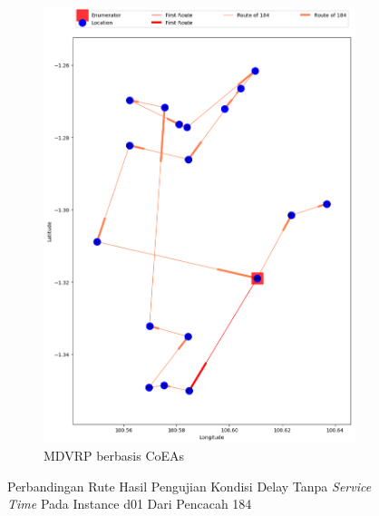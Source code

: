 \begin{figure}[H]
	\centering
	\begin{subfigure}[t]{\textwidth}
		\centering
		\includegraphics[width=\textwidth]{Resources/Images/delayed_1/real_m15_n100_delayed_1_184_coes}
		\caption{MDVRP berbasis CoEAs}
		\label{fig:real_m15_n100_delayed_1_184_coes}
	\end{subfigure}
	\caption{Perbandingan Rute Hasil Pengujian Kondisi Delay Tanpa \textit{Service Time} Pada Instance d01 Dari Pencacah 184}
	\label{fig:real_m15_n100_delayed_1_184}
\end{figure}


